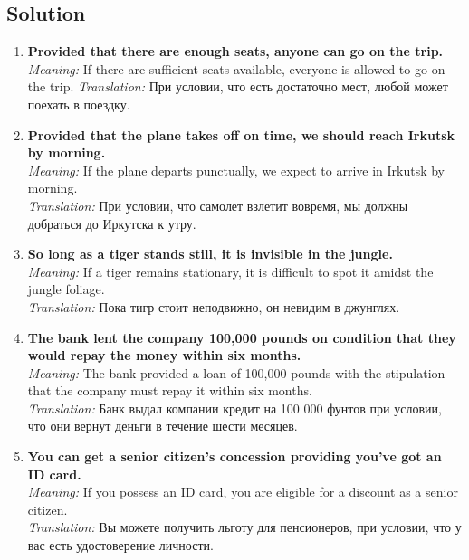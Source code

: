 \subsection*{Solution}
\begin{enumerate}
      \item \textbf{Provided that there are enough seats, anyone can go on the trip.}
            \textit{Meaning:} If there are sufficient seats available, everyone is allowed to go on the trip.
            \textit{Translation:} При условии, что есть достаточно мест, любой может поехать в поездку.

      \item \textbf{Provided that the plane takes off on time, we should reach Irkutsk by morning.} \\
            \textit{Meaning:} If the plane departs punctually, we expect to arrive in Irkutsk by morning. \\
            \textit{Translation:} При условии, что самолет взлетит вовремя, мы должны добраться до Иркутска к утру.

      \item \textbf{So long as a tiger stands still, it is invisible in the jungle.} \\
            \textit{Meaning:} If a tiger remains stationary, it is difficult to spot it amidst the jungle foliage. \\
            \textit{Translation:} Пока тигр стоит неподвижно, он невидим в джунглях.

      \item \textbf{The bank lent the company 100,000 pounds on condition that they would repay the money within six months.} \\
            \textit{Meaning:} The bank provided a loan of 100,000 pounds with the stipulation that the company must repay it within six months.  \\
            \textit{Translation:} Банк выдал компании кредит на 100 000 фунтов при условии, что они вернут деньги в течение шести месяцев.

      \item \textbf{You can get a senior citizen’s concession providing you’ve got an ID card.} \\
            \textit{Meaning:} If you possess an ID card, you are eligible for a discount as a senior citizen. \\
            \textit{Translation:} Вы можете получить льготу для пенсионеров, при условии, что у вас есть удостоверение личности.


\end{enumerate}
